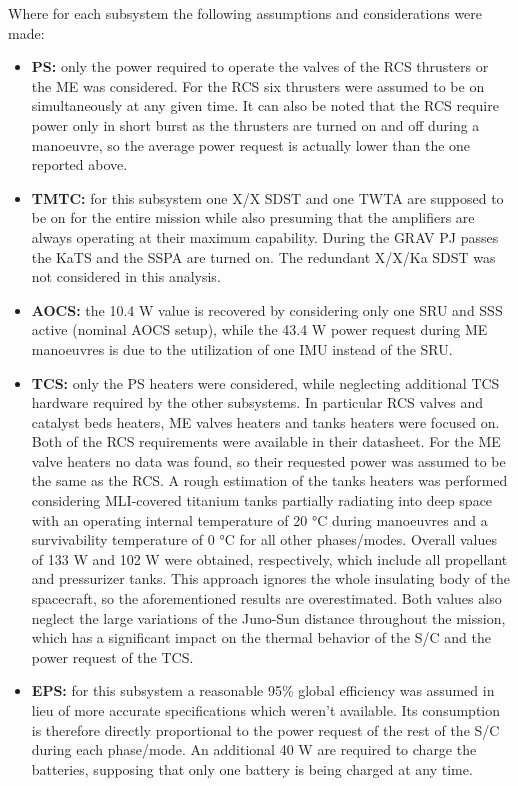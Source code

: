Where for each subsystem the following assumptions and considerations were made:
\begin{itemize}
    \item \textbf{PS:} only the power required to operate the valves of the RCS thrusters or the ME was considered. For the RCS six thrusters were assumed to be on simultaneously at any given time. It can also be noted that the RCS require power only in short burst as the thrusters are turned on and off during a manoeuvre, so the average power request is actually lower than the one reported above.
    \item \textbf{TMTC:} for this subsystem one X/X SDST and one TWTA are supposed to be on for the entire mission while also presuming that the amplifiers are always operating at their maximum capability. During the GRAV PJ passes the KaTS and the SSPA are turned on. The redundant X/X/Ka SDST was not considered in this analysis.
    \item \textbf{AOCS:} the 10.4 W value is recovered by considering only one SRU and SSS active (nominal AOCS setup), while the 43.4 W power request during ME manoeuvres is due to the utilization of one IMU instead of the SRU.
    \item \textbf{TCS:} only the PS heaters were considered, while neglecting additional TCS hardware required by the other subsystems. In particular RCS valves and catalyst beds heaters, ME valves heaters and tanks heaters were focused on. Both of the RCS requirements were available in their datasheet. \cite{RCS_values}
    For the ME valve heaters no data was found, so their requested power was assumed to be the same as the RCS. A rough estimation of the tanks heaters was performed considering MLI-covered titanium tanks partially radiating into deep space with an operating internal temperature of 20 °C during manoeuvres and a survivability temperature of 0 °C for all other phases/modes. Overall values of 133 W and 102 W were obtained, respectively, which include all propellant and pressurizer tanks. This approach ignores the whole insulating body of the spacecraft, so the aforementioned results are overestimated. Both values also neglect the large variations of the Juno-Sun distance throughout the mission, which has a significant impact on the thermal behavior of the S/C and the power request of the TCS. 
    \item \textbf{EPS:} for this subsystem a reasonable 95\% global efficiency was assumed in lieu of more accurate specifications which weren't available. Its consumption is therefore directly proportional to the power request of the rest of the S/C during each phase/mode. An additional 40 W are required to charge the batteries, \cite{batteries_info} supposing that only one battery is being charged at any time.     

\end{itemize}
